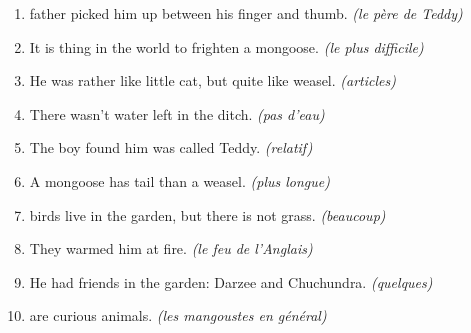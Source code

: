 \documentclass[troisieme]{fiche}
\begin{document}
\entete





\begin{anglais}
\begin{enumerate}[label=\arabic*.,itemsep=2.5mm,leftmargin=*]
  \item {} father picked him up between his finger and thumb.
    \emph{(le père de Teddy)}
  \item It is  thing in the world to frighten a mongoose.
    \emph{(le plus difficile)}
  \item He was rather like  little cat, but quite like  weasel.
    \emph{(articles)}
  \item There wasn't  water left in the ditch. \emph{(pas d'eau)}
  \item The boy  found him was called Teddy. \emph{(relatif)}
  \item A mongoose has  tail than a weasel. \emph{(plus longue)}
  \item {} birds live in the garden, but there is not  grass.
    \emph{(beaucoup)}
  \item They warmed him at  fire. \emph{(le feu de l'Anglais)}
  \item He had  friends in the garden: Darzee and Chuchundra.
    \emph{(quelques)}
  \item {} are curious animals. \emph{(les mangoustes en général)}
\end{enumerate}
\end{anglais}

\end{document}

